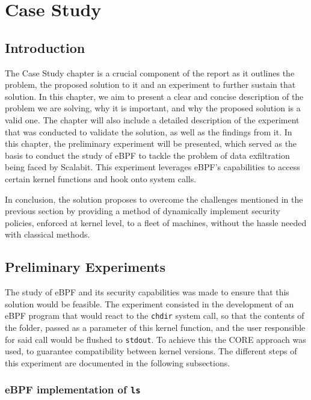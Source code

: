 \chapter{Case Study}

\section{Introduction}
The Case Study chapter is a crucial component of the report as it outlines the problem, the proposed solution to it and an experiment to further sustain that solution. In this chapter, we aim to present a clear and concise description of the problem we are solving, why it is important, and why the proposed solution is a valid one. The chapter will also include a detailed description of the experiment that was conducted to validate the solution, as well as the findings from it.
In this chapter, the preliminary experiment will be presented, which served as the basis to conduct the study of eBPF to tackle the problem of data exfiltration being faced by Scalabit. This experiment leverages eBPF's capabilities to access certain kernel functions and hook onto system calls.


In conclusion, the solution proposes to overcome the challenges mentioned in the previous section by providing a method of dynamically implement security policies, enforced at kernel level, to a fleet of machines, without the hassle needed with classical methods.


\section{Preliminary Experiments}

The study of eBPF and its security capabilities was made to ensure that this solution would be feasible. The experiment consisted in the development of an eBPF program that would react to the \texttt{chdir} system call, so that the contents of the folder, passed as a parameter of this kernel function, and the user responsible for said call would be flushed to \texttt{stdout}. To achieve this the CO\-RE approach was used, to guarantee compatibility between kernel versions. The different steps of this experiment are documented in the following subsections.


\subsection{\textbf{eBPF implementation of \texttt{ls}}}

